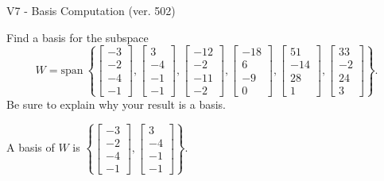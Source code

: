 \begin{exercise}
  \begin{exerciseTitle}V7 - Basis Computation (ver. 502)\end{exerciseTitle}
  \begin{exerciseStatement}
    Find a basis for the subspace 
\[W=\mathrm{span}\ \left\{\left[\begin{array}{r}
-3 \\
-2 \\
-4 \\
-1
\end{array}\right] , \left[\begin{array}{r}
3 \\
-4 \\
-1 \\
-1
\end{array}\right] , \left[\begin{array}{r}
-12 \\
-2 \\
-11 \\
-2
\end{array}\right] , \left[\begin{array}{r}
-18 \\
6 \\
-9 \\
0
\end{array}\right] , \left[\begin{array}{r}
51 \\
-14 \\
28 \\
1
\end{array}\right] , \left[\begin{array}{r}
33 \\
-2 \\
24 \\
3
\end{array}\right]\right\}.\]
 Be sure to explain why your result is a basis.


  \end{exerciseStatement}
  \begin{exerciseAnswer}
   A basis of \(W\) is  \(\left\{\left[\begin{array}{r}
-3 \\
-2 \\
-4 \\
-1
\end{array}\right] , \left[\begin{array}{r}
3 \\
-4 \\
-1 \\
-1
\end{array}\right]\right\}\).
  


  \end{exerciseAnswer}
\end{exercise}